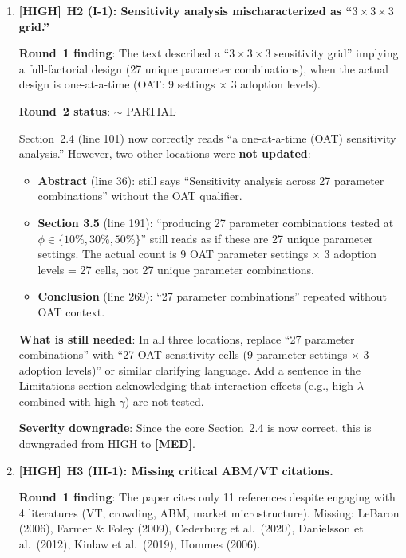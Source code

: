\documentclass[12pt,a4paper]{article}
\newcommand{\HIGH}{\textbf{\textcolor{errorred}{[HIGH]}}}
\newcommand{\MED}{\textbf{\textcolor{warncolor}{[MED]}}}
\newcommand{\PARTIAL}{\textcolor{warncolor}{$\sim$ PARTIAL}}
\begin{document}
\begin{enumerate}
\medskip

\item \HIGH\ \textbf{H2 (I-1): Sensitivity analysis mischaracterized as ``$3\times3\times3$ grid.''}

\textbf{Round~1 finding}: The text described a ``$3\times3\times3$ sensitivity grid'' implying a full-factorial design (27 unique parameter combinations), when the actual design is one-at-a-time (OAT: 9 settings $\times$ 3 adoption levels).

\textbf{Round~2 status}: \PARTIAL

Section~2.4 (line 101) now correctly reads ``a one-at-a-time (OAT) sensitivity analysis.'' However, two other locations were \textbf{not updated}:
\begin{itemize}
  \item \textbf{Abstract} (line 36): still says ``Sensitivity analysis across 27 parameter combinations'' without the OAT qualifier.
  \item \textbf{Section 3.5} (line 191): ``producing 27 parameter combinations tested at $\phi \in \{10\%, 30\%, 50\%\}$'' still reads as if these are 27 unique parameter settings. The actual count is 9 OAT parameter settings $\times$ 3 adoption levels = 27 cells, not 27 unique parameter combinations.
  \item \textbf{Conclusion} (line 269): ``27 parameter combinations'' repeated without OAT context.
\end{itemize}

\textbf{What is still needed}: In all three locations, replace ``27 parameter combinations'' with ``27 OAT sensitivity cells (9 parameter settings $\times$ 3 adoption levels)'' or similar clarifying language. Add a sentence in the Limitations section acknowledging that interaction effects (e.g., high-$\lambda$ combined with high-$\gamma$) are not tested.

\textbf{Severity downgrade}: Since the core Section~2.4 is now correct, this is downgraded from HIGH to \MED.

\medskip

\item \HIGH\ \textbf{H3 (III-1): Missing critical ABM/VT citations.}

\textbf{Round~1 finding}: The paper cites only 11 references despite engaging with 4 literatures (VT, crowding, ABM, market microstructure). Missing: LeBaron (2006), Farmer \& Foley (2009), Cederburg et al.\ (2020), Danielsson et al.\ (2012), Kinlaw et al.\ (2019), Hommes (2006).


\end{enumerate}
\end{document}
